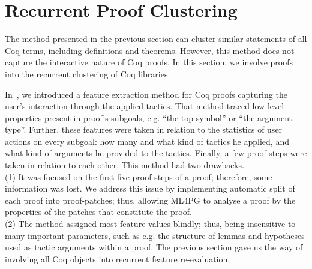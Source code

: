 \section{Recurrent Proof Clustering}\label{sec:recurrent}

The method presented in the previous section can cluster similar statements of all Coq terms, including definitions and theorems. 
However, this method does not capture the interactive nature of Coq proofs.
In this section, we involve proofs into the recurrent clustering of Coq libraries.

 In~\cite{KHG13}, 
we introduced a feature extraction method for Coq proofs capturing
the user's interaction through the applied tactics. That method 
traced 
low-level properties present in proof's subgoals, e.g. ``the
top symbol'' or ``the argument type''. Further, these features were taken
in relation to the statistics of user actions on every subgoal: how many and what
kind of tactics he applied, and what kind of arguments he provided to the
tactics. Finally, a few proof-steps were taken in relation to each other.
This method  had two drawbacks.\\ 
(1) It was  focused on the first
five proof-steps of a proof; therefore, some information was lost. We address this issue by implementing automatic split of each proof into proof-patches; thus, allowing ML4PG to analyse a proof by the properties
of the patches that constitute the proof. \\
(2) The method assigned most feature-values blindly; thus, being insensitive to many important parameters, such as e.g. the structure of lemmas and hypotheses used as 
tactic arguments within a proof. 
The previous section gave us the way of involving all Coq objects into recurrent feature re-evaluation.




